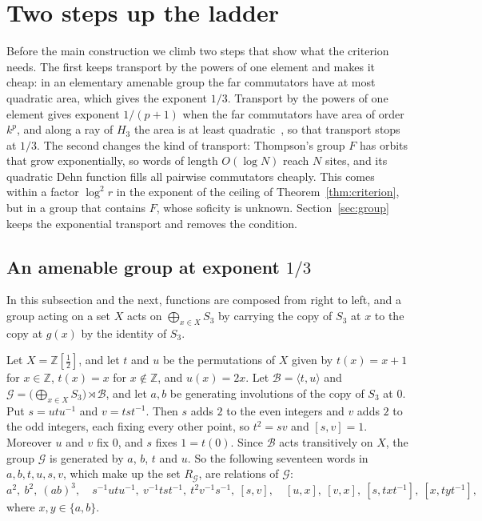 \section{Two steps up the ladder}\label{sec:ladder}

Before the main construction we climb two steps that show what the criterion needs. The first keeps transport by the powers of one element
and makes it cheap: in an elementary amenable group the far commutators have at most quadratic area, which gives the exponent $1/3$.
Transport by the powers of one element gives exponent $1/(p+1)$ when the far commutators have area of order $k^p$, and along a ray of $H_3$ the
area is at least quadratic~\cite[Proposition~3.4]{DouglasMghirbiA}, so that transport stops at $1/3$. The second changes the kind of transport: Thompson's group $F$ has orbits that grow
exponentially, so words of length $O(\log N)$ reach $N$ sites, and its quadratic Dehn function fills all pairwise commutators cheaply. This comes
within a factor $\log^2r$ in the exponent of the ceiling of Theorem~\ref{thm:criterion}, but in a group that contains $F$, whose soficity is unknown.
Section~\ref{sec:group} keeps the exponential transport and removes the condition.

\subsection{An amenable group at exponent \texorpdfstring{$1/3$}{1/3}}\label{sec:dyadic}

In this subsection and the next, functions are composed from right to left, and a group acting on a set $X$ acts on
$\bigoplus_{x\in X}S_3$ by carrying the copy of $S_3$ at $x$ to the copy at $g(x)$ by the identity of $S_3$.

Let $X=\mathbb Z[\frac12]$, and let $t$ and $u$ be the permutations of $X$ given by $t(x)=x+1$ for $x\in\mathbb Z$, $t(x)=x$ for
$x\notin\mathbb Z$, and $u(x)=2x$. Let $\mathcal B=\langle t,u\rangle$ and $\mathcal G=\bigl(\bigoplus_{x\in X}S_3\bigr)\rtimes\mathcal B$, and let $a,b$ be
generating involutions of the copy of $S_3$ at $0$. Put $s=utu^{-1}$ and $v=tst^{-1}$. Then $s$ adds $2$ to the even integers and $v$ adds $2$
to the odd integers, each fixing every other point, so $t^2=sv$ and $[s,v]=1$. Moreover $u$ and $v$ fix $0$, and $s$ fixes $1=t(0)$. Since $\mathcal B$ acts transitively on $X$, the group $\mathcal G$ is generated by $a$,
$b$, $t$ and $u$. So the
following seventeen words in $a,b,t,u,s,v$, which make up the set $R_{\mathcal G}$, are relations of $\mathcal G$:
\[
a^2,\ b^2,\ (ab)^3,\quad s^{-1}utu^{-1},\ v^{-1}tst^{-1},\ t^2v^{-1}s^{-1},\ [s,v],\quad [u,x],\ [v,x],\ [s,txt^{-1}],\ [x,tyt^{-1}],
\]
where $x,y\in\{a,b\}$.


